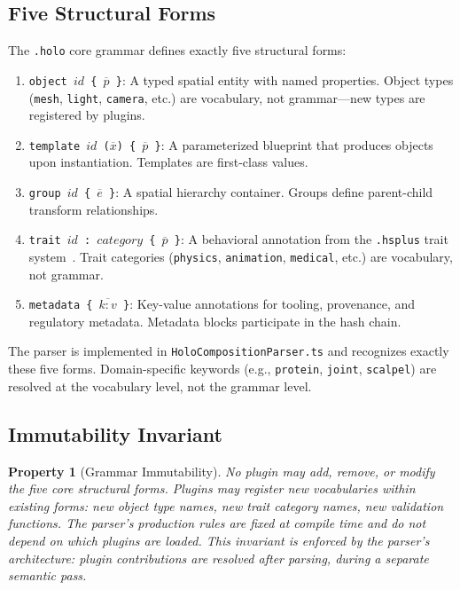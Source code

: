 \documentclass[sigconf,nonacm]{acmart}
\providecommand{\hsplus}{\texttt{.hsplus}}
\newcommand{\holo}{\texttt{.holo}}
\newtheorem{property}{Property}
\begin{document}
\subsection{Five Structural Forms}

The \holo{} core grammar defines exactly five structural forms:

\begin{enumerate}
  \item \texttt{object $id$ \{ $\overline{p}$ \}}: A typed
    spatial entity with named properties. Object types
    (\texttt{mesh}, \texttt{light}, \texttt{camera}, etc.)
    are vocabulary, not grammar---new types are registered
    by plugins.
  \item \texttt{template $id$ ($\overline{x}$) \{ $\overline{p}$ \}}:
    A parameterized blueprint that produces objects upon
    instantiation. Templates are first-class values.
  \item \texttt{group $id$ \{ $\overline{e}$ \}}: A spatial
    hierarchy container. Groups define parent-child
    transform relationships.
  \item \texttt{trait $id$ : $category$ \{ $\overline{p}$ \}}:
    A behavioral annotation from the \hsplus{} trait
    system~\cite{paper-11-hsplus-ecoop2027}. Trait categories
    (\texttt{physics}, \texttt{animation}, \texttt{medical},
    etc.) are vocabulary, not grammar.
  \item \texttt{metadata \{ $\overline{k{:}v}$ \}}: Key-value
    annotations for tooling, provenance, and regulatory
    metadata. Metadata blocks participate in the hash chain.
\end{enumerate}

The parser is implemented in
\texttt{HoloCompositionParser.ts} and
recognizes exactly these five forms. Domain-specific keywords
(e.g., \texttt{protein}, \texttt{joint}, \texttt{scalpel})
are resolved at the vocabulary level, not the grammar level.

\subsection{Immutability Invariant}
\begin{property}[Grammar Immutability]
No plugin may add, remove, or modify the five core
structural forms. Plugins may register new vocabularies
\emph{within} existing forms: new object type names, new
trait category names, new validation functions. The parser's
production rules are fixed at compile time and do not depend
on which plugins are loaded. This invariant is enforced by
the parser's architecture: plugin contributions are resolved
\emph{after} parsing, during a separate semantic pass.
\end{property}
\end{document}
